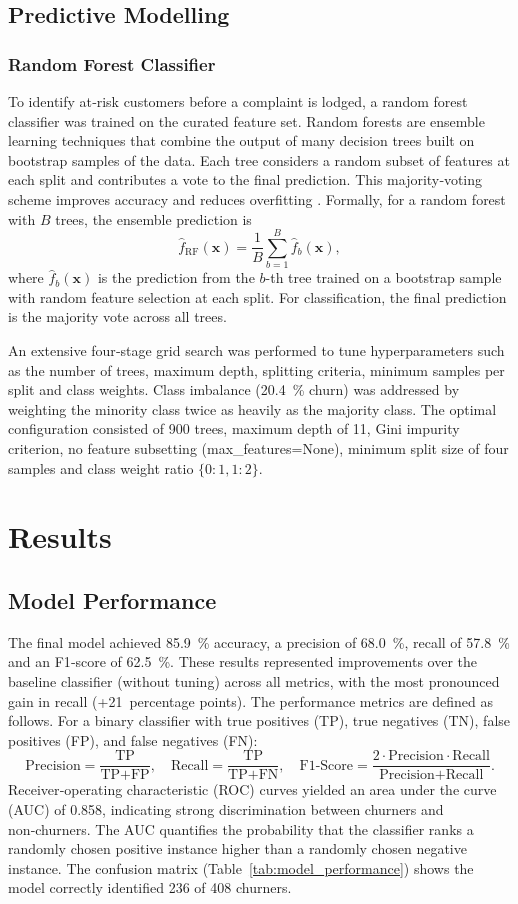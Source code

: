 \documentclass[12pt]{article}
\begin{document}
\subsection{Predictive Modelling}
\subsubsection{Random Forest Classifier}
To identify at‑risk customers before a complaint is lodged, a random forest classifier was trained on the curated feature set.  Random forests are ensemble learning techniques that combine the output of many decision trees built on bootstrap samples of the data.  Each tree considers a random subset of features at each split and contributes a vote to the final prediction.  This majority‑voting scheme improves accuracy and reduces overfitting \citep{geeksforgeeks_randomforest}.  Formally, for a random forest with \(B\) trees, the ensemble prediction is
\[ \hat{f}_{\text{RF}}(\mathbf{x}) = \frac{1}{B} \sum_{b=1}^{B} \hat{f}_b(\mathbf{x}), \]
where \(\hat{f}_b(\mathbf{x})\) is the prediction from the \(b\)-th tree trained on a bootstrap sample with random feature selection at each split.  For classification, the final prediction is the majority vote across all trees.

An extensive four‑stage grid search was performed to tune hyperparameters such as the number of trees, maximum depth, splitting criteria, minimum samples per split and class weights.  Class imbalance (20.4~\% churn) was addressed by weighting the minority class twice as heavily as the majority class.  The optimal configuration consisted of 900 trees, maximum depth of 11, Gini impurity criterion, no feature subsetting (max\_features=None), minimum split size of four samples and class weight ratio \(\{0:1,1:2\}\).

\section{Results}
\subsection{Model Performance}
The final model achieved 85.9~\% accuracy, a precision of 68.0~\%, recall of 57.8~\% and an F1‑score of 62.5~\%.  These results represented improvements over the baseline classifier (without tuning) across all metrics, with the most pronounced gain in recall (+21~percentage points).  The performance metrics are defined as follows.  For a binary classifier with true positives (TP), true negatives (TN), false positives (FP), and false negatives (FN):
\[ \text{Precision} = \frac{\text{TP}}{\text{TP} + \text{FP}}, \quad \text{Recall} = \frac{\text{TP}}{\text{TP} + \text{FN}}, \quad \text{F1-Score} = \frac{2 \cdot \text{Precision} \cdot \text{Recall}}{\text{Precision} + \text{Recall}}. \]
Receiver‑operating characteristic (ROC) curves yielded an area under the curve (AUC) of 0.858, indicating strong discrimination between churners and non‑churners.  The AUC quantifies the probability that the classifier ranks a randomly chosen positive instance higher than a randomly chosen negative instance.  The confusion matrix (Table~\ref{tab:model_performance}) shows the model correctly identified 236 of 408 churners.
\end{document}
